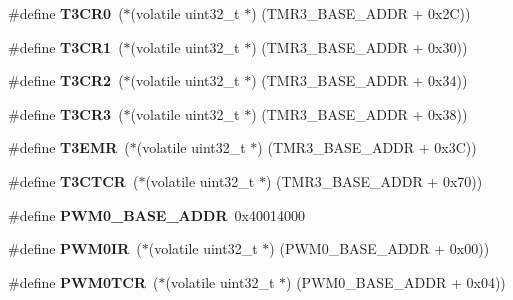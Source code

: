 \begin{DoxyCompactItemize}
\#define {\bfseries T3\+C\+R0}~($\ast$(volatile uint32\+\_\+t $\ast$) (T\+M\+R3\+\_\+\+B\+A\+S\+E\+\_\+\+A\+D\+DR + 0x2\+C))
\item 
\mbox{\label{group__lpc24xx__regs_ga1f051c4cda65617798e6d9031f101aa5}} 
\#define {\bfseries T3\+C\+R1}~($\ast$(volatile uint32\+\_\+t $\ast$) (T\+M\+R3\+\_\+\+B\+A\+S\+E\+\_\+\+A\+D\+DR + 0x30))
\item 
\mbox{\label{group__lpc24xx__regs_ga74f0ac5fbb3fde6e9407bade0cf27203}} 
\#define {\bfseries T3\+C\+R2}~($\ast$(volatile uint32\+\_\+t $\ast$) (T\+M\+R3\+\_\+\+B\+A\+S\+E\+\_\+\+A\+D\+DR + 0x34))
\item 
\mbox{\label{group__lpc24xx__regs_gad6eaa329ae59efcbf1af8a98dc34d43e}} 
\#define {\bfseries T3\+C\+R3}~($\ast$(volatile uint32\+\_\+t $\ast$) (T\+M\+R3\+\_\+\+B\+A\+S\+E\+\_\+\+A\+D\+DR + 0x38))
\item 
\mbox{\label{group__lpc24xx__regs_ga294ebf9b5083cac0bf4cbcb40fd4108e}} 
\#define {\bfseries T3\+E\+MR}~($\ast$(volatile uint32\+\_\+t $\ast$) (T\+M\+R3\+\_\+\+B\+A\+S\+E\+\_\+\+A\+D\+DR + 0x3\+C))
\item 
\mbox{\label{group__lpc24xx__regs_gab6e5c6db01307c185d12f0624f1831f4}} 
\#define {\bfseries T3\+C\+T\+CR}~($\ast$(volatile uint32\+\_\+t $\ast$) (T\+M\+R3\+\_\+\+B\+A\+S\+E\+\_\+\+A\+D\+DR + 0x70))
\item 
\mbox{\label{group__lpc24xx__regs_ga7f045a579f769a95960885379c6d2403}} 
\#define {\bfseries P\+W\+M0\+\_\+\+B\+A\+S\+E\+\_\+\+A\+D\+DR}~0x40014000
\item 
\mbox{\label{group__lpc24xx__regs_gafb4d07cba08019d8391b62d01475d4d2}} 
\#define {\bfseries P\+W\+M0\+IR}~($\ast$(volatile uint32\+\_\+t $\ast$) (P\+W\+M0\+\_\+\+B\+A\+S\+E\+\_\+\+A\+D\+DR + 0x00))
\item 
\mbox{\label{group__lpc24xx__regs_gaebfa692ee2fbdc6fb80546e098d32700}} 
\#define {\bfseries P\+W\+M0\+T\+CR}~($\ast$(volatile uint32\+\_\+t $\ast$) (P\+W\+M0\+\_\+\+B\+A\+S\+E\+\_\+\+A\+D\+DR + 0x04))
\item 

\end{DoxyCompactItemize}
